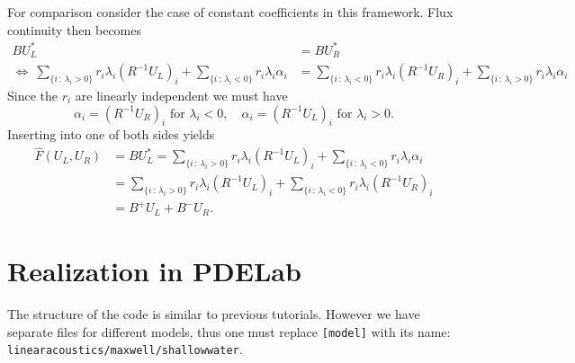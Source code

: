 \documentclass[a4paper,12pt]{article}
\theoremstyle{definition}
\theoremstyle{definition}
\begin{document}
For comparison consider the case of constant coefficients in this framework.
Flux continuity then becomes
\begin{align*}
B U_L^\ast &= B U_R^\ast\\
\Leftrightarrow\ 
\sum_{\{i \,:\, \lambda_i> 0\}} r_i \lambda_i (R^{-1} U_L)_i + \sum_{\{i \,:\, \lambda_i<0\}} r_i \lambda_i \alpha_i
&= \sum_{\{i \,:\, \lambda_i< 0\}} r_i \lambda_i (R^{-1} U_R)_i + \sum_{\{i \,:\, \lambda_i>0\}} r_i \lambda_i \alpha_i 
\end{align*}
Since the $r_i$ are linearly independent we must have
\begin{equation*}
\alpha_i = (R^{-1} U_R)_i\text{ for $\lambda_i<0$}, \quad 
\alpha_i = (R^{-1} U_L)_i\text{ for $\lambda_i>0$}.
\end{equation*}
Inserting into one of both sides yields
\begin{equation*}
\begin{split}
\hat F(U_L,U_R) &= B U_L^\ast = \sum_{\{i \,:\, \lambda_i> 0\}} r_i \lambda_i (R^{-1} U_L)_i + \sum_{\{i \,:\, \lambda_i<0\}} r_i \lambda_i \alpha_i\\
&= \sum_{\{i \,:\, \lambda_i> 0\}} r_i \lambda_i (R^{-1} U_L)_i + \sum_{\{i \,:\, \lambda_i<0\}} r_i \lambda_i (R^{-1} U_R)_i\\
&= B^+U_L + B^- U_R .
\end{split}
\end{equation*}


\section{Realization in PDELab}

The structure of the code is similar to previous tutorials. However we have separate files for different models, thus one must replace \lstinline{[model]} with its name: \lstinline{linearacoustics/maxwell/shallowwater}. 
\end{document}
